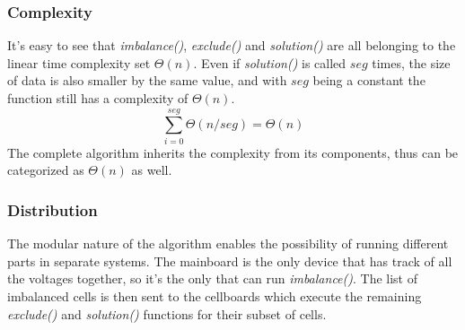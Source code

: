 \subsubsection{Complexity}
It's easy to see that \textit{imbalance()}, \textit{exclude()} and \textit{solution()} are all belonging to the linear time complexity set $\Theta(n)$.
Even if \textit{solution()} is called $seg$ times, the size of data is also smaller by the same value, and with $seg$ being a constant the function still has a complexity of $\Theta(n)$.
\[
    \sum_{i=0}^{seg} \Theta(n/seg) = \Theta(n)
\]
The complete algorithm inherits the complexity from its components, thus can be categorized as $\Theta(n)$ as well.

\subsubsection{Distribution}
The modular nature of the algorithm enables the possibility of running different parts in separate systems. The mainboard is the only device that has track of all the voltages together, so it's the only that can run \textit{imbalance()}. The list of imbalanced cells is then sent to the cellboards which execute the remaining \textit{exclude()} and \textit{solution()} functions for their subset of cells.

\newpage

